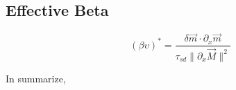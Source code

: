 \cite{numerical}

\subsection{Effective Beta}


\begin{equation} \label{eq:beta}
(\beta \upsilon)^{*} = \frac{\delta\vec{m} \cdot \partial_x \vec{m}}{\tau_{sd} \| \partial_x \vec{M} \|^2}
\end{equation}



\vspace{3.2em}


In summarize, 
